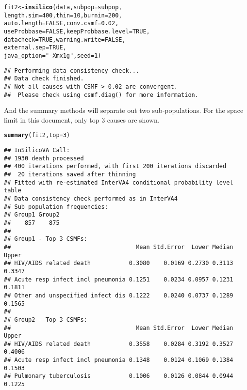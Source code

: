 \documentclass{article}\usepackage[]{graphicx}\usepackage[]{color}
\makeatletter
\newcommand{\hlnum}[1]{\textcolor[rgb]{0.686,0.059,0.569}{#1}}%
\newcommand{\hlstr}[1]{\textcolor[rgb]{0.192,0.494,0.8}{#1}}%
\newcommand{\hlstd}[1]{\textcolor[rgb]{0.345,0.345,0.345}{#1}}%
\newcommand{\hlkwb}[1]{\textcolor[rgb]{0.69,0.353,0.396}{#1}}%
\newcommand{\hlkwc}[1]{\textcolor[rgb]{0.333,0.667,0.333}{#1}}%
\newcommand{\hlkwd}[1]{\textcolor[rgb]{0.737,0.353,0.396}{\textbf{#1}}}%
\newenvironment{kframe}{%
 \def\at@end@of@kframe{}%
 \ifinner\ifhmode%
  \def\at@end@of@kframe{\end{minipage}}%
  \begin{minipage}{\columnwidth}%
 \fi\fi%
 \def\FrameCommand##1{\hskip\@totalleftmargin \hskip-\fboxsep
 \colorbox{shadecolor}{##1}\hskip-\fboxsep
     \hskip-\linewidth \hskip-\@totalleftmargin \hskip\columnwidth}%
 \MakeFramed {\advance\hsize-\width
   \@totalleftmargin\z@ \linewidth\hsize
   \@setminipage}}%
 {\par\unskip\endMakeFramed%
 \at@end@of@kframe}
\newenvironment{knitrout}{}{} %
\makeatother
\begin{document}
\begin{knitrout}
\color{fgcolor}\begin{kframe}
\begin{alltt}
\hlstd{fit2} \hlkwb{<-} \hlkwd{insilico}\hlstd{( data,} \hlkwc{subpop} \hlstd{= subpop,}
  \hlkwc{length.sim} \hlstd{=} \hlnum{400}\hlstd{,} \hlkwc{thin} \hlstd{=} \hlnum{10}\hlstd{,} \hlkwc{burnin} \hlstd{=} \hlnum{200}\hlstd{,}
  \hlkwc{auto.length} \hlstd{=} \hlnum{FALSE}\hlstd{,} \hlkwc{conv.csmf} \hlstd{=} \hlnum{0.02}\hlstd{,}
  \hlkwc{useProbbase} \hlstd{=} \hlnum{FALSE}\hlstd{,} \hlkwc{keepProbbase.level} \hlstd{=} \hlnum{TRUE}\hlstd{,}
  \hlkwc{datacheck} \hlstd{=} \hlnum{TRUE}\hlstd{,} \hlkwc{warning.write} \hlstd{=} \hlnum{FALSE}\hlstd{,}
  \hlkwc{external.sep} \hlstd{=} \hlnum{TRUE}\hlstd{,}
  \hlkwc{java_option} \hlstd{=} \hlstr{"-Xmx1g"}\hlstd{,} \hlkwc{seed} \hlstd{=} \hlnum{1}\hlstd{)}
\end{alltt}
\begin{verbatim}
## Performing data consistency check...
## Data check finished.
## Not all causes with CSMF > 0.02 are convergent.
##  Please check using csmf.diag() for more information.
\end{verbatim}
\end{kframe}
\end{knitrout}

And the summary methods will separate out two sub-populations. For the space limit in this document, only top 3 causes are shown.
\begin{knitrout}
\color{fgcolor}\begin{kframe}
\begin{alltt}
\hlkwd{summary}\hlstd{(fit2,} \hlkwc{top} \hlstd{=} \hlnum{3}\hlstd{)}
\end{alltt}
\begin{verbatim}
## InSilicoVA Call: 
## 1930 death processed
## 400 iterations performed, with first 200 iterations discarded
##  20 iterations saved after thinning
## Fitted with re-estimated InterVA4 conditional probability level table
## Data consistency check performed as in InterVA4 
## Sub population frequencies:
## Group1 Group2 
##    857    875 
## 
## Group1 - Top 3 CSMFs:
##                                    Mean Std.Error  Lower Median  Upper
## HIV/AIDS related death           0.3080    0.0169 0.2730 0.3113 0.3347
## Acute resp infect incl pneumonia 0.1251    0.0234 0.0957 0.1231 0.1811
## Other and unspecified infect dis 0.1222    0.0240 0.0737 0.1289 0.1565
## 
## Group2 - Top 3 CSMFs:
##                                    Mean Std.Error  Lower Median  Upper
## HIV/AIDS related death           0.3558    0.0284 0.3192 0.3527 0.4006
## Acute resp infect incl pneumonia 0.1348    0.0124 0.1069 0.1384 0.1503
## Pulmonary tuberculosis           0.1006    0.0126 0.0844 0.0944 0.1225
\end{verbatim}
\end{kframe}
\end{knitrout}
\end{document}
